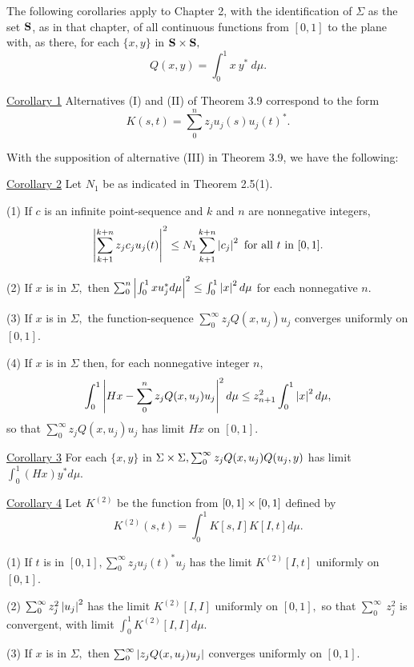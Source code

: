 The following corollaries apply to Chapter 2, with the identification of $\Sigma$ as the set $\textbf{S}$, as in that chapter, of all continuous functions from $[0,1]$ to the plane with, as there, for each $\{x,y\}$ in $\textbf{S} \times \textbf{S},$\nl
\[
Q(x,y) = \int_{0}^{1}x~y^{*}~d\mu. %
\]

\underline{Corollary 1}  Alternatives (I) and (II) of Theorem 3.9 correspond to the form \nl
\[
K(s,t) = \sum_{0}^{n}z_{j}u_{j}(s)u_{j}(t)^{*}.
\]

With the supposition of alternative (III) in Theorem 3.9, we have the following:\nl

\underline{Corollary 2}  Let $N_{1}$ be as indicated in Theorem 2.5(1).\nl

\indent (1) If $c$ is an infinite point-sequence and $k$ and $n$ are nonnegative integers,\nl
\[
\left|\sum_{k+1}^{k+n}z_{j}c_{j}u_{j}(t)\right|^{2} \leq N_{1}\sum_{k+1}^{k+n} \left|c_{j}\right|^{2} \text{~for~all~} t \text{~in~} [0,1].
\]

\indent (2) If $x$ is in $\Sigma,$ then $\sum_{0}^{n}\left|\int_{0}^{1}xu_{j}^{*} d\mu\right|^{2} \leq \int_{0}^{1}\left|x\right|^{2} d\mu$ for each nonnegative $n.$\nl

\indent (3) If $x$ is in $\Sigma,$ the function-sequence $\sum_{0}^{\infty}z_{j}Q(x,u_{j})u_{j}$ converges uniformly on $[0,1].$\nl

\indent (4)  If $x$ is in $\Sigma$ then, for each nonnegative integer $n,$\nl
\[
\int_{0}^{1}\left|Hx - \sum_{0}^{n}z_{j}Q(x,u_{j})u_{j}\right|^{2}d\mu \leq z_{n+1}^{2}\int_{0}^{1}\left|x\right|^{2}d\mu,
\]
so that $\sum_{0}^{\infty}z_{j}Q(x,u_{j})u_{j}$ has limit $Hx$ on $[0,1].$\nl

\underline{Corollary 3}  For each $\{x,y\}$ in $\Sigma \times \Sigma, \sum_{0}^{\infty}z_{j}Q(x,u_{j})Q(u_{j},y)$ has limit $\int_{0}^{1} (Hx)y^{*}d\mu.$\nl

\underline{Corollary 4}  Let $K^{(2)}$ be the function from $[0,1] \times [0,1]$ defined by \nl
\[
K^{(2)}(s,t) = \int_{0}^{1}K[s,I]K[I,t]d\mu.
\]

\indent (1) If $t$ is in $[0,1], \sum_{0}^{\infty}z_{j}u_{j}(t)^{*}u_{j}$ has the limit $K^{(2)}[I,t]$ uniformly on $[0,1].$

\indent (2) $\sum_{0}^{\infty} z_{j}^{2}\left|u_{j}\right|^{2}$ has the limit $K^{(2)}[I,I]$ uniformly on $[0,1],$ so that $\sum_{0}^{\infty}~z_{j}^{2}$ is convergent, with limit $\int_{0}^{1} K^{(2)}[I,I]d\mu.$\nl

\indent (3) If $x$ is in $\Sigma,$ then $\sum_{0}^{\infty}\left|z_{j}Q(x,u_{j})u_{j}\right|$ converges uniformly on $[0,1].$\nl

